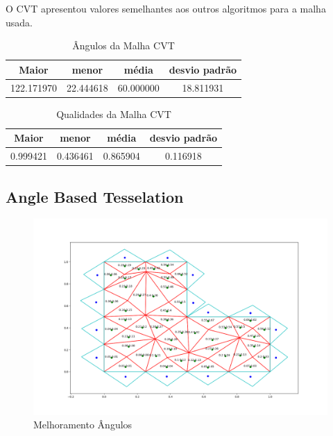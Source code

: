 O CVT apresentou valores semelhantes aos outros algoritmos para a malha usada.

\begin{table}[hb]
\centering
\par\caption{Ângulos da Malha CVT}
\begin{tabular}{c|c|c|c}
Maior&menor&média&desvio padrão\\\hline\hline
122.171970&22.444618&60.000000&18.811931\\\hline
\end{tabular}
\label{tab:angulos-malha-cvt}
\end{table}

\begin{table}[hb]
\centering
\par\caption{Qualidades da Malha CVT}
\begin{tabular}{c|c|c|c}
Maior&menor&média&desvio padrão\\\hline\hline
0.999421&0.436461&0.865904&0.116918\\\hline
\end{tabular}
\label{tab:qualidades-malha-cvt}
\end{table}

\newpage
\subsection{Angle Based Tesselation}

\begin{figure}[ht]
    \centering
    \includegraphics[width=1\linewidth]{fig/malha-angulos.png}
    \caption{Melhoramento Ângulos}
    \label{fig:malha-angulos}
\end{figure}

